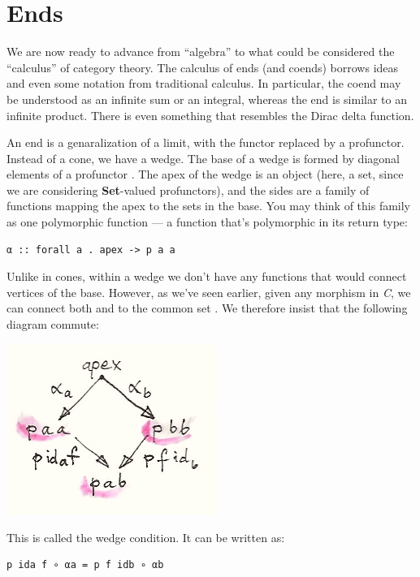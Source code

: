 \section{Ends}\label{ends}

We are now ready to advance from ``algebra'' to what could be considered
the ``calculus'' of category theory. The calculus of ends (and coends)
borrows ideas and even some notation from traditional calculus. In
particular, the coend may be understood as an infinite sum or an
integral, whereas the end is similar to an infinite product. There is
even something that resembles the Dirac delta function.

An end is a genaralization of a limit, with the functor replaced by a
profunctor. Instead of a cone, we have a wedge. The base of a wedge is
formed by diagonal elements of a profunctor . The apex of the
wedge is an object (here, a set, since we are considering
\textbf{Set}-valued profunctors), and the sides are a family of
functions mapping the apex to the sets in the base. You may think of
this family as one polymorphic function --- a function that's
polymorphic in its return type:

\begin{verbatim}
α :: forall a . apex -> p a a
\end{verbatim}

Unlike in cones, within a wedge we don't have any functions that would
connect vertices of the base. However, as we've seen earlier, given any
morphism  in \emph{C}, we can connect both
 and  to the common set
. We therefore insist that the following diagram
commute:

\includegraphics[width=2.69792in]{images/end-2.jpg}

This is called the wedge condition. It can be written as:

\begin{verbatim}
p ida f ∘ αa = p f idb ∘ αb
\end{verbatim}

